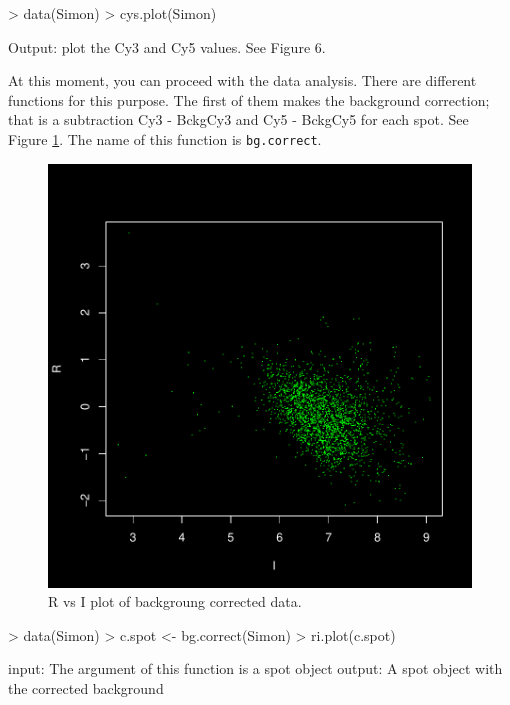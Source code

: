 \documentclass[12pt]{article}
\begin{document}
\begin{Scode}
> data(Simon)
> cys.plot(Simon)
\end{Scode}
\begin{Soutput}
Output: plot the Cy3 and Cy5 values. See Figure 6.
\end{Soutput}
At this moment, you can proceed with the data analysis. There are different functions for this purpose. The first of them makes the background correction; that is a subtraction Cy3 - BckgCy3 and Cy5 - BckgCy5 for each spot. See Figure \ref{fig7}. The name of this function is \texttt{bg.correct}.
\begin{figure}[h]
\begin{center}
\includegraphics{example-genArise-009}
\caption{R vs I plot of backgroung corrected data. \label{fig7}}
\end{center}
\end{figure}
\begin{Scode}
> data(Simon)
> c.spot <- bg.correct(Simon)
> ri.plot(c.spot)
\end{Scode}

\begin{Soutput}
input: The argument of this function is a spot object
output: A spot object with the corrected background
\end{Soutput}
\end{document}
